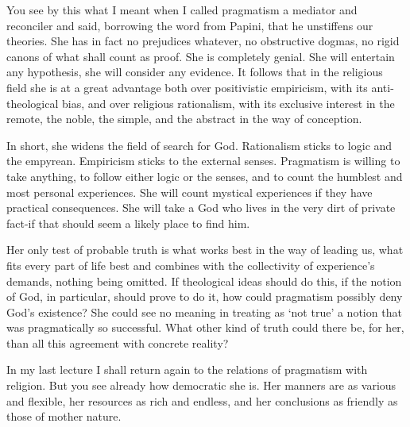 \documentclass[]{article}
\begin{document}
You see by this what I meant when I called pragmatism a mediator and
reconciler and said, borrowing the word from Papini, that he unstiffens
our theories. She has in fact no prejudices whatever, no obstructive
dogmas, no rigid canons of what shall count as proof. She is completely
genial. She will entertain any hypothesis, she will consider any
evidence. It follows that in the religious field she is at a great
advantage both over positivistic empiricism, with its anti-theological
bias, and over religious rationalism, with its exclusive interest in
the remote, the noble, the simple, and the abstract in the way of
conception.

In short, she widens the field of search for God. Rationalism sticks
to logic and the empyrean. Empiricism sticks to the external senses.
Pragmatism is willing to take anything, to follow either logic or the
senses, and to count the humblest and most personal experiences. She
will count mystical experiences if they have practical consequences.
She will take a God who lives in the very dirt of private fact-if that
should seem a likely place to find him.

Her only test of probable truth is what works best in the way of leading
us, what fits every part of life best and combines with the collectivity
of experience's demands, nothing being omitted. If theological ideas
should do this, if the notion of God, in particular, should prove to do
it, how could pragmatism possibly deny God's existence? She could see
no meaning in treating as `not true' a notion that was pragmatically so
successful. What other kind of truth could there be, for her, than all
this agreement with concrete reality?

In my last lecture I shall return again to the relations of pragmatism
with religion. But you see already how democratic she is. Her manners
are as various and flexible, her resources as rich and endless, and her
conclusions as friendly as those of mother nature.
\end{document}
